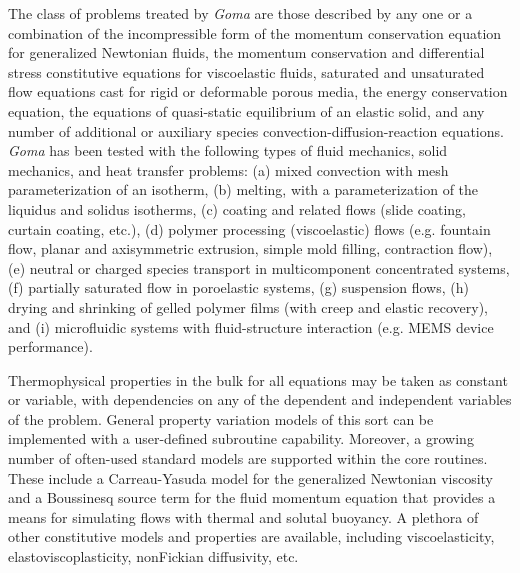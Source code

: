 The class of problems treated by \emph{Goma} are those described by any one or a combination of the incompressible form of the momentum conservation equation for generalized Newtonian fluids, the momentum conservation and differential stress constitutive equations for viscoelastic fluids, saturated and unsaturated flow equations cast for rigid or deformable porous media, the energy conservation equation, the equations of quasi-static equilibrium of an elastic solid, and any number of additional or auxiliary species convection-diffusion-reaction equations. \emph{Goma} has been tested with the following types of fluid mechanics, solid mechanics, and heat transfer problems: (a) mixed convection with mesh parameterization of an isotherm, (b) melting, with a parameterization of the liquidus and solidus isotherms, (c) coating and related flows (slide coating, curtain coating, etc.), (d) polymer processing (viscoelastic) flows (e.g. fountain flow, planar and axisymmetric extrusion, simple mold filling, contraction flow), (e) neutral or charged species transport in multicomponent concentrated systems, (f) partially saturated flow in poroelastic systems, (g) suspension flows, (h) drying and shrinking of gelled polymer films (with creep and elastic recovery), and (i) microfluidic systems with fluid-structure interaction (e.g. MEMS device performance).

Thermophysical properties in the bulk for all equations may be taken as constant or variable, with dependencies on any of the dependent and independent variables of the problem. General property variation models of this sort can be implemented with a user-defined subroutine capability. Moreover, a growing number of often-used standard models are supported within the core routines. These include a Carreau-Yasuda model for the generalized Newtonian viscosity and a Boussinesq source term for the fluid momentum equation that provides a means for simulating flows with thermal and solutal buoyancy. A plethora of other constitutive models and properties are available, including viscoelasticity, elastoviscoplasticity, nonFickian diffusivity, etc.

